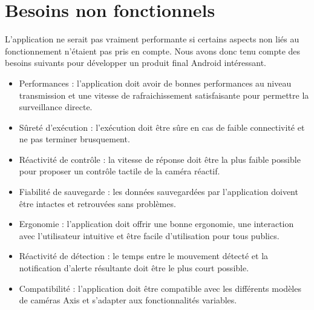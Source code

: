 \section{Besoins non fonctionnels}
L'application ne serait pas vraiment performante si certains aspects non liés au fonctionnement n'étaient pas pris en compte. Nous avons donc tenu compte des besoins suivants pour développer un produit final Android intéressant.
\begin{itemize}
  \item Performances : l'application doit avoir de bonnes performances au niveau transmission et une vitesse de rafraichissement satisfaisante pour permettre la surveillance directe.
  \item Sûreté d'exécution : l'exécution doit être sûre en cas de faible connectivité et ne pas terminer brusquement.
  \item Réactivité de contrôle : la vitesse de réponse doit être la plus faible possible pour proposer un contrôle tactile de la caméra réactif.
  \item Fiabilité de sauvegarde : les données sauvegardées par l'application doivent être intactes et retrouvées sans problèmes.
  \item Ergonomie : l'application doit offrir une bonne ergonomie, une interaction avec l'utilisateur intuitive et être facile d'utilisation pour tous publics.
  \item Réactivité de détection : le temps entre le mouvement détecté et la notification d'alerte résultante doit être le plus court possible.
  \item Compatibilité : l'application doit être compatible avec les différents modèles de caméras Axis et s'adapter aux fonctionnalités variables.
\end{itemize}
\clearpage